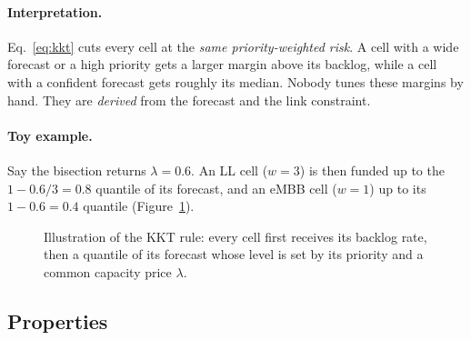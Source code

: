 \paragraph{Interpretation.} Eq.~\eqref{eq:kkt} cuts every cell at the \emph{same priority-weighted risk}. A cell with a wide forecast or a high priority gets a larger margin above its backlog, while a cell with a confident forecast gets roughly its median. Nobody tunes these margins by hand. They are \emph{derived} from the forecast and the link constraint.

\paragraph{Toy example.} Say the bisection returns $\lambda = 0.6$. An LL cell ($w=3$) is then funded up to the $1 - 0.6/3 = 0.8$ quantile of its forecast, and an eMBB cell ($w=1$) up to its $1-0.6 = 0.4$ quantile (Figure~\ref{fig:kkt-toy}).

\begin{figure}[H]
\centering
{}
\caption{Illustration of the KKT rule: every cell first receives its backlog rate, then a quantile of its forecast whose level is set by its priority and a common capacity price $\lambda$.}
\label{fig:kkt-toy}
\end{figure}

\subsection{Properties}

